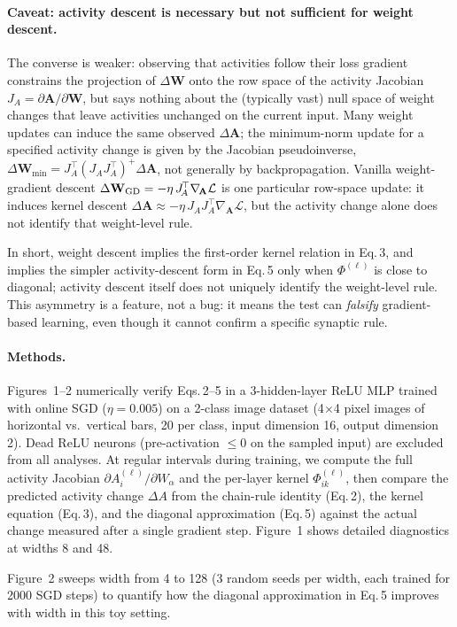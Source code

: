 \documentclass[10pt]{article}
\newcommand{\vW}{\mathbf{W}}
\newcommand{\vA}{\mathbf{A}}
\newcommand{\loss}{\mathcal{L}}
\begin{document}
\paragraph{Caveat: activity descent is necessary but not sufficient for weight descent.}
The converse is weaker: observing that activities follow their loss gradient constrains the projection of $\Delta\vW$ onto the row space of the activity Jacobian $J_{\!A} = \partial \vA/\partial \vW$, but says nothing about the (typically vast) null space of weight changes that leave activities unchanged on the current input.  Many weight updates can induce the same observed $\Delta\vA$; the minimum-norm update for a specified activity change is given by the Jacobian pseudoinverse, $\Delta\vW_{\min} = J_{\!A}^{\!\top}(J_{\!A}J_{\!A}^{\!\top})^{+}\Delta\vA$, not generally by backpropagation.  Vanilla weight-gradient descent $\Delta\vW_{\rm GD} = -\eta\,J_{\!A}^{\!\top}\nabla_{\!\vA}\loss$ is one particular row-space update: it induces kernel descent $\Delta\vA \approx -\eta\,J_{\!A}J_{\!A}^{\!\top}\nabla_{\!\vA}\loss$, but the activity change alone does not identify that weight-level rule.

In short, weight descent implies the first-order kernel relation in Eq.\,3, and implies the simpler activity-descent form in Eq.\,5 only when $\Phi^{(\ell)}$ is close to diagonal; activity descent itself does not uniquely identify the weight-level rule.  This asymmetry is a feature, not a bug: it means the test can \emph{falsify} gradient-based learning, even though it cannot confirm a specific synaptic rule.

\paragraph{Methods.}
Figures~1--2 numerically verify Eqs.\,2--5 in a 3-hidden-layer ReLU MLP trained with online SGD ($\eta=0.005$) on a 2-class image dataset (4$\times$4 pixel images of horizontal vs.\ vertical bars, 20 per class, input dimension 16, output dimension 2).  Dead ReLU neurons (pre-activation $\leq 0$ on the sampled input) are excluded from all analyses.  At regular intervals during training, we compute the full activity Jacobian $\partial A_i^{(\ell)}/\partial W_\alpha$ and the per-layer kernel $\Phi^{(\ell)}_{ik}$, then compare the predicted activity change $\Delta A$ from the chain-rule identity (Eq.\,2), the kernel equation (Eq.\,3), and the diagonal approximation (Eq.\,5) against the actual change measured after a single gradient step.  Figure~1 shows detailed diagnostics at widths 8 and 48.

Figure~2 sweeps width from 4 to 128 (3 random seeds per width, each trained for 2000 SGD steps) to quantify how the diagonal approximation in Eq.\,5 improves with width in this toy setting.
\end{document}
